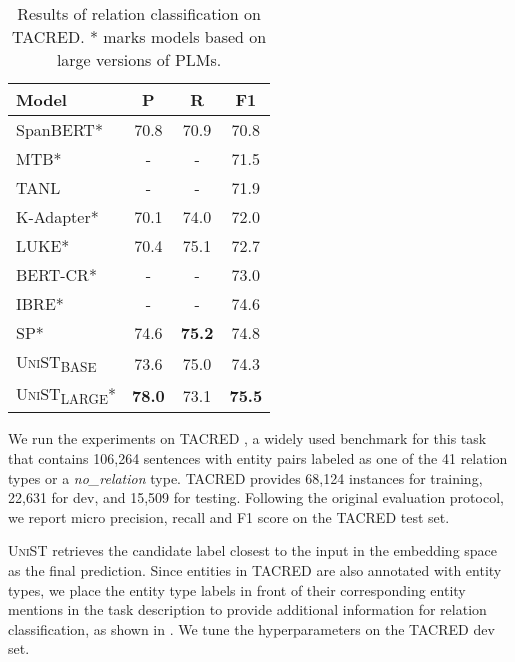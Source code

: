 \documentclass[11pt]{article}
\newcommand{\model}{\textsc{UniST}\xspace}
\newcommand{\basemodel}{\textsc{UniST}\textsubscript{BASE}}
\newcommand{\largemodel}{\textsc{UniST}\textsubscript{LARGE}}
\newcommand{\stitle}[1]{\vspace{1ex} \noindent{\bf #1}}
\begin{document}
\begin{table}[t]
    \centering
    \small
    \setlength{\tabcolsep}{4pt}
    \begin{tabular}{l|ccc}
        \toprule
        Model & P & R & F1 \\
        \midrule
        SpanBERT* \cite{joshi-etal-2020-spanbert} & 70.8 & 70.9 & 70.8 \\
        MTB* \cite{baldini-soares-etal-2019-matching} & - & - & 71.5 \\
        TANL \cite{paolini2021structured} & - & - & 71.9 \\
        K-Adapter* \cite{wang-etal-2021-k} & 70.1 & 74.0 & 72.0 \\
        LUKE* \cite{yamada-etal-2020-luke} & 70.4 & 75.1 & 72.7 \\
        BERT-CR* \cite{zhou-chen-2021-learning} & - & - & 73.0 \\
        IBRE* \cite{zhou2021improved} & - & - & 74.6 \\
        SP* \cite{cohen2020relation} & 74.6 & \textbf{75.2} & 74.8 \\
\midrule
        \basemodel & 73.6 & 75.0 & 74.3 \\
\largemodel* & \textbf{78.0} & 73.1 & \textbf{75.5} \\
\bottomrule
    \end{tabular}
\caption{Results of relation classification on TACRED. * marks models based on large versions of PLMs.}
    \label{tab:tacred}
\end{table} 
\stitle{Dataset.}
We run the experiments on TACRED \cite{zhang-etal-2017-position}, a widely used benchmark for this task that contains 106,264 sentences with entity pairs labeled as one of the 41 relation types or a \textit{no\_relation} type. TACRED provides 68,124 instances for training, 22,631 for dev, and 15,509 for testing. Following the original evaluation protocol, we report micro precision, recall and F1 score on the TACRED test set.

\stitle{Model Configuration.}
\model retrieves the candidate label closest to the input in the embedding space as the final prediction. Since entities in TACRED are also annotated with entity types, we place the entity type labels in front of their corresponding entity mentions in the task description to provide additional information for relation classification, as shown in . We tune the hyperparameters on the TACRED dev set.
\end{document}
